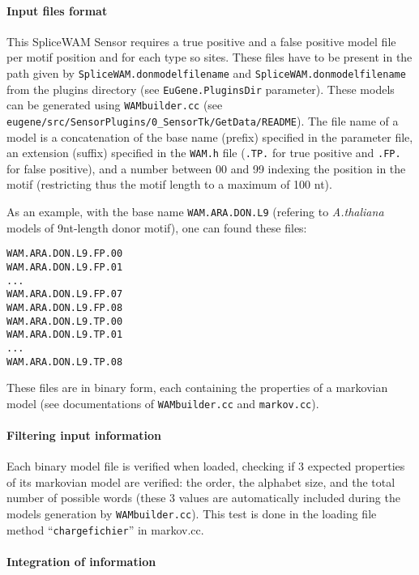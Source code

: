 \paragraph{Input files format}

This SpliceWAM Sensor requires a true positive and a false positive
model file per motif position and for each type so sites. These files
have to be present in the path given by
\texttt{SpliceWAM.donmodelfilename} and
\texttt{SpliceWAM.donmodelfilename} from the plugins directory (see
\texttt{EuGene.PluginsDir} parameter). These models can be generated
using \texttt{WAMbuilder.cc} (see
\texttt{eugene/src/SensorPlugins/0\_SensorTk/GetData/README}).  The
file name of a model is a concatenation of the base name (prefix)
specified in the parameter file, an extension (suffix) specified in
the \texttt{WAM.h} file (\texttt{.TP.} for true positive and
\texttt{.FP.}  for false positive), and a number between 00 and 99
indexing the position in the motif (restricting thus the motif length
to a maximum of 100 nt).

As an example, with the base name \texttt{WAM.ARA.DON.L9} (refering to
{\em A.thaliana} models of 9nt-length donor motif), one can found these files:
\begin{Verbatim}[fontsize=\small]
WAM.ARA.DON.L9.FP.00
WAM.ARA.DON.L9.FP.01
...
WAM.ARA.DON.L9.FP.07
WAM.ARA.DON.L9.FP.08
WAM.ARA.DON.L9.TP.00
WAM.ARA.DON.L9.TP.01
...
WAM.ARA.DON.L9.TP.08
\end{Verbatim}

These files are in binary form, each containing the properties of a
markovian model (see documentations of \texttt{WAMbuilder.cc} and
\texttt{markov.cc}).

\paragraph{Filtering input information}

Each binary model file is verified when loaded, checking if 3 expected
properties of its markovian model are verified: the order, the
alphabet size, and the total number of possible words (these 3 values
are automatically included during the models generation by
\texttt{WAMbuilder.cc}). This test is done in the loading file method
``\texttt{chargefichier}'' in markov.cc.

\paragraph{Integration of information}

